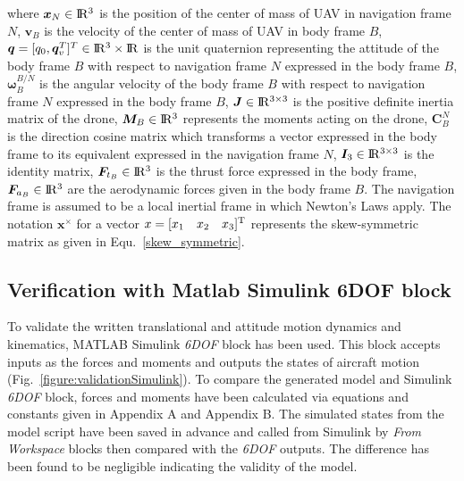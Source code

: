 where $\bm{x}_{N} \in {\rm I\!R^3}  $ is the position of the center of mass of UAV in navigation frame $N$, $\bm{v}_B$ is the velocity of the center of mass of UAV in body frame $B$,  $\bm{q} = [q_0, \bm{q}_v^T] ^T \in {\rm I\!R^3} \times {\rm I\!R}$ is the unit quaternion representing the attitude of the body frame $B$ with respect to navigation frame $N$ expressed in the body frame $B$, $\bm{\omega}^{B/N}_B$ is the angular velocity of the body frame $B$ with respect to navigation frame $N$ expressed in the body frame $B$, $ \bm{J} \in {\rm I\!R^{3\times3}}  $ is the positive definite inertia matrix of the drone, $\bm{M}_B \in {\rm I\!R^3}$ represents the moments acting on the drone, $ \bm{C}_B^N$ is the direction cosine matrix which transforms a vector expressed in the body frame to its equivalent expressed in the navigation frame $N$, $\bm{I}_3  \in {\rm I\!R^{3\times3}}$ is the identity matrix, $\bm{F}_{t_B} \in {\rm I\!R^3}$ is the thrust force expressed in the body frame,  $\bm{F}_{a_B} \in {\rm I\!R^3}$ are the aerodynamic forces given in the body frame $B$. 
The navigation frame is assumed to be a local inertial frame in which Newton's Laws apply. 
The notation $\bm{x} ^{\times} $ for a vector $x = [x_1 \quad x_2 \quad x_3]^ {\rm{T}}$ represents the skew-symmetric matrix as given in Equ.~\ref{skew_symmetric}.

\iffalse
\subsection{Verification with Matlab Simulink 6DOF block}

To validate the written translational and attitude motion dynamics and kinematics, MATLAB Simulink \textit{6DOF} block has been used.
This block accepts inputs as the forces and moments and outputs the states of aircraft motion (Fig.~\ref{figure:validationSimulink}).
To compare the generated model and Simulink \textit{6DOF} block, forces and moments have been calculated via equations and constants given in Appendix A and Appendix B.
The simulated states from the model script have been saved in advance and called from Simulink by \textit{From Workspace} blocks then compared with the \textit{6DOF} outputs.
The difference has been found to be negligible indicating the validity of the model. 


